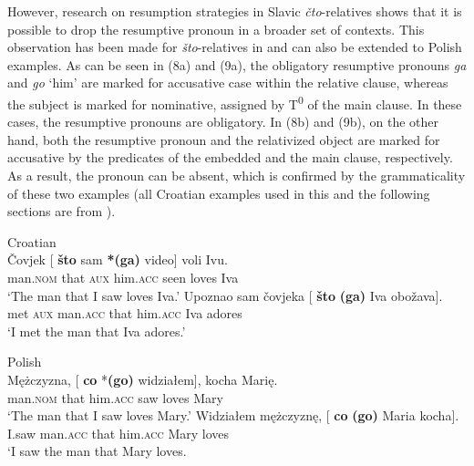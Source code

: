 \documentclass[output=paper]{langsci/langscibook}
\begin{document}
However, research on resumption strategies in Slavic \textit{čto}{}-relatives shows that it is possible to drop the resumptive pronoun in a broader set of contexts. This observation has been made for  \textit{što}{}-relatives in \citet[29]{Gračanin-Yuksek2013} and can also be extended to Polish examples. As can be seen in (8a) and (9a), the obligatory resumptive pronouns \textit{ga} and \textit{go} ‘him’ are marked for accusative case within the relative clause, whereas the subject is marked for nominative, assigned by T\textsuperscript{0} of the main clause. In these cases, the resumptive pronouns are obligatory. In (8b) and (9b), on the other hand, both the resumptive pronoun and the relativized object are marked for accusative by the predicates of the embedded and the main clause, respectively. As a result, the pronoun can be absent, which is confirmed by the grammaticality of these two examples (all Croatian examples used in this and the following sections are from \citealt{Gračanin-Yuksek2013}). 

\ea%
    Croatian\label{ex:leska:8}\\
    \ea
    \gll Čovjek   [  \textbf{što}   sam \textbf{*(ga)}   video]   voli   Ivu.\\
          man.\textsc{nom}  {} that \textsc{aux}   him.\textsc{acc}   seen   loves   Iva\\
    \glt ‘The man that I saw loves Iva.’
    \ex
    \gll Upoznao   sam čovjeka [  \textbf{što} \textbf{(ga)}   Iva obožava].\\
         met   \textsc{aux} man.\textsc{acc} {}  that him.\textsc{acc} Iva adores\\
    \glt ‘I met the man that Iva adores.’
    \z
\z    

\ea%
    Polish\label{ex:leska:9}\\
    \ea
    \gll Mężczyzna, [ \textbf{co} *\textbf{(go)}   widziałem],   kocha   Marię.\\
         man.\textsc{nom} {}  that him.\textsc{acc}   saw     loves   Mary\\
    \glt ‘The man that I saw loves Mary.’
    \ex
    \gll Widziałem   mężczyznę, [  \textbf{co} \textbf{(go)}   Maria   kocha]. \\
          I.saw     man.\textsc{acc} {}  that him.\textsc{acc}   Mary   loves\\
    \glt ‘I saw the man that Mary loves.
    \z
\z
          
\end{document}
